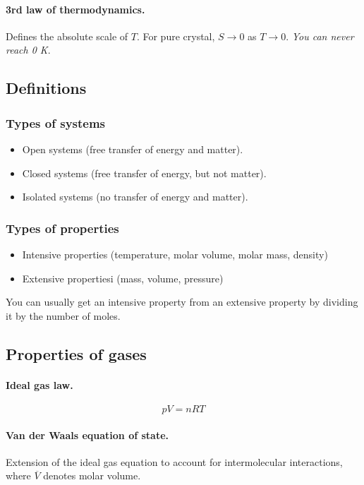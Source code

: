 \documentclass{article}
\numberwithin{theorem}{section}
\numberwithin{corollary}{section}
\numberwithin{postulate}{section}
\numberwithin{lemma}{section}
\numberwithin{definition}{section}
\begin{document}
\paragraph{3rd law of thermodynamics.} Defines the absolute scale of $T$. For
pure crystal, $S \rightarrow 0$ as $T \rightarrow 0$. \textit{You can never
reach 0 K}.

\subsection{Definitions}

\subsubsection{Types of systems}
\begin{itemize}
  \item Open systems (free transfer of energy and matter).
  \item Closed systems (free transfer of energy, but not matter).
  \item Isolated systems (no transfer of energy and matter).
\end{itemize}

\subsubsection{Types of properties}
\begin{itemize}
  \item{Intensive properties (temperature, molar volume, molar mass, density)}
  \item{Extensive propertiesi (mass, volume, pressure)}
\end{itemize}

You can usually get an intensive property from an extensive property by dividing
it by the number of moles.

\subsection{Properties of gases}

\paragraph{Ideal gas law. }
\begin{equation}
  pV = nRT
\end{equation}

\paragraph{Van der Waals equation of state.} Extension of the ideal gas equation
to account for intermolecular interactions, where $\overline{V}$ denotes molar
volume. 
\end{document}

